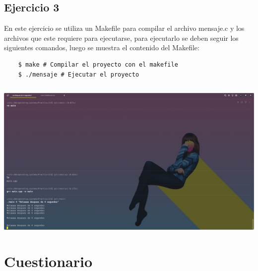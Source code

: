\documentclass[]{article}
\newenvironment{code}{\captionsetup{type=listing}}{}
\begin{document}
\subsection{Ejercicio 3}
En este ejercicio se utiliza un Makefile para compilar el archivo mensaje.c
y los archivos que este requiere para ejecutarse, para ejecutarlo se deben 
seguir los siguientes comandos, luego se muestra el contenido del Makefile:
\begin{verbatim}
	$ make # Compilar el proyecto con el makefile
	$ ./mensaje # Ejecutar el proyecto
\end{verbatim}

\begin{code}
	\label{code:c-code}
	\inputminted{Makefile}{../E3/Makefile}
\end{code}
		
\includegraphics[scale=0.3,trim={0 0 20cm 20cm},clip]{e2-out.png}  


\section{Cuestionario}


\renewcommand{\listlistingname}{Indice Source Code}
\listoflistings


		
	
\end{document}
